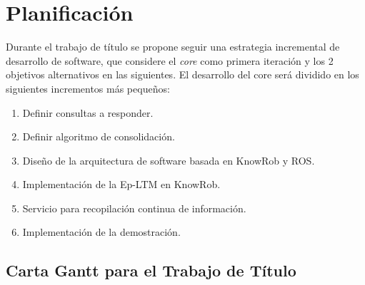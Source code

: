 

\section{Planificaci\'on}

Durante el trabajo de t\'itulo se propone seguir una estrategia incremental de desarrollo de software, que considere el \textit{core} como primera iteraci\'on y los 2 objetivos alternativos en las siguientes. El desarrollo del core ser\'a dividido en los siguientes incrementos m\'as peque\~nos:
\begin{enumerate}[topsep=0pt]
\setlength\itemsep{0.2em}
\item Definir consultas a responder.

\item Definir algoritmo de consolidaci\'on.

\item Dise\~no de la arquitectura de software basada en KnowRob y ROS.

\item Implementaci\'on de la Ep-LTM en KnowRob.

\item Servicio para recopilaci\'on continua de informaci\'on.

\item Implementaci\'on de la demostraci\'on.
\end{enumerate}


\subsection{Carta Gantt para el Trabajo de T\'itulo}


